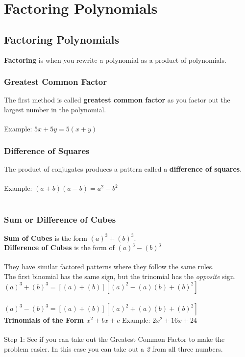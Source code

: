 \chapter{Factoring Polynomials}


\section{Factoring Polynomials}
\textbf{Factoring} is when you rewrite a polynomial as a product of polynomials.\\

\subsection{Greatest Common Factor}
The first method is called \textbf{greatest common factor} as you factor out the largest number in the polynomial.\\
\\
Example: $5x + 5y = 5(x + y)$\\

\subsection{Difference of Squares}
The product of conjugates produces a pattern called a \textbf{difference of squares}.\\
\\
Example: $(a + b)(a - b) = a^2 - b^2$\\
\\

\subsection{Sum or Difference of Cubes}
\textbf{Sum of Cubes} is the form $(a)^3 + (b)^3$.\\
\textbf{Difference of Cubes} is the form of $(a)^3 - (b)^3$\\
\\
They have similar factored patterns where they follow the same rules.\\
The first binomial has the same sign, but the trinomial has the \textit{opposite} sign.\\
$(a)^3 + (b)^3 = [(a) + (b)][(a)^2 - (a)(b) + (b)^2]$\\
\\
$(a)^3 - (b)^3 = [(a) + (b)][(a)^2 + (a)(b) + (b)^2]$\\


\textbf{Trinomials of the Form $x^2 + bx + c$}
Example: $2x^2 + 16x + 24$ \\
\\
Step 1: See if you can take out the Greatest Common Factor to make the problem easier. In this case you can take out a \textit{2} from all three numbers.


